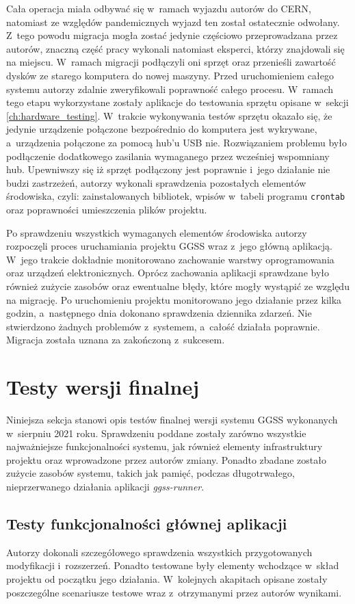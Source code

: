Cała operacja miała odbywać się w~ramach wyjazdu autorów do CERN, natomiast ze względów pandemicznych wyjazd ten został ostatecznie odwołany. Z~tego powodu migracja mogła zostać jedynie częściowo przeprowadzana przez autorów, znaczną część pracy wykonali natomiast eksperci, którzy znajdowali się na miejscu. W~ramach migracji podłączyli oni sprzęt oraz przenieśli zawartość dysków ze starego komputera do nowej maszyny. Przed uruchomieniem całego systemu autorzy zdalnie zweryfikowali poprawność całego procesu. W~ramach tego etapu wykorzystane zostały aplikacje do testowania sprzętu opisane w~sekcji \ref{ch:hardware_testing}. W~trakcie wykonywania testów sprzętu okazało się, że jedynie urządzenie połączone bezpośrednio do komputera jest wykrywane, a~urządzenia połączone za pomocą hub'u USB nie. Rozwiązaniem problemu było podłączenie dodatkowego zasilania wymaganego przez wcześniej wspomniany hub. Upewniwszy się iż sprzęt podłączony jest poprawnie i~jego działanie nie budzi zastrzeżeń, autorzy wykonali sprawdzenia pozostałych elementów środowiska, czyli: zainstalowanych bibliotek, wpisów w~tabeli programu \lstinline{crontab} oraz poprawności umieszczenia plików projektu.

Po sprawdzeniu wszystkich wymaganych elementów środowiska autorzy rozpoczęli proces uruchamiania projektu GGSS wraz z~jego główną aplikacją. W~jego trakcie dokładnie monitorowano zachowanie warstwy oprogramowania oraz urządzeń elektronicznych. Oprócz zachowania aplikacji sprawdzane było również zużycie zasobów oraz ewentualne błędy, które mogły wystąpić ze względu na migrację. Po uruchomieniu projektu monitorowano jego działanie przez kilka godzin, a~następnego dnia dokonano sprawdzenia dziennika zdarzeń. Nie stwierdzono żadnych problemów z~systemem, a~całość działała poprawnie. Migracja została uznana za zakończoną z~sukcesem.

\section{Testy wersji finalnej}
Niniejsza sekcja stanowi opis testów finalnej wersji systemu GGSS wykonanych w~sierpniu 2021 roku. Sprawdzeniu poddane zostały zarówno wszystkie najważniejsze funkcjonalności systemu, jak również elementy infrastruktury projektu oraz wprowadzone przez autorów zmiany. Ponadto zbadane zostało zużycie zasobów systemu, takich jak pamięć, podczas długotrwałego, nieprzerwanego działania aplikacji \emph{ggss-runner}. 

\subsection{Testy funkcjonalności głównej aplikacji}
Autorzy dokonali szczegółowego sprawdzenia wszystkich przygotowanych modyfikacji i~rozszerzeń. Ponadto testowane były elementy wchodzące w~skład projektu od początku jego działania. W~kolejnych akapitach opisane zostały poszczególne scenariusze testowe wraz z~otrzymanymi przez autorów wynikami.

